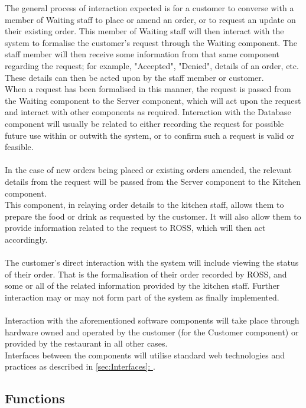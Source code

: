 \documentclass[11pt, a4paper]{report}
\newcommand{\gref}[1]{\hyperref[#1]{\autoref*{#1}: \nameref{#1}}} %
\begin{document}
\noindent
The general process of interaction expected is for a customer to converse with a member of Waiting staff to place or amend an order, or to request an update on their existing order. This member of Waiting staff will then interact with the system to formalise the customer's request through the Waiting component. The staff member will then receive some information from that same component regarding the request; for example, "Accepted", "Denied", details of an order, etc. These details can then be acted upon by the staff member or customer.\\
When a request has been formalised in this manner, the request is passed from the Waiting component to the Server component, which will act upon the request and interact with other components as required. Interaction with the Database component will usually be related to either recording the request for possible future use within or outwith the system, or to confirm such a request is valid or feasible.\\
\\
In the case of new orders being placed or existing orders amended, the relevant details from the request will be passed from the Server component to the Kitchen component.\\
This component, in relaying order details to the kitchen staff, allows them to prepare the food or drink as requested by the customer. It will also allow them to provide information related to the request to ROSS, which will then act accordingly.\\
\\
The customer's direct interaction with the system will include viewing the status of their order. That is the formalisation of their order recorded by ROSS, and some or all of the related information provided by the kitchen staff. Further interaction may or may not form part of the system as finally implemented.
\\
\\
Interaction with the aforementioned software components will take place through hardware owned and operated by the customer (for the Customer component) or provided by the restaurant in all other cases.\\
Interfaces between the components will utilise standard web technologies and practices as described in \gref{sec:Interfaces}.

\subsection{Functions} \label{subsec:Functions}
\end{document}
